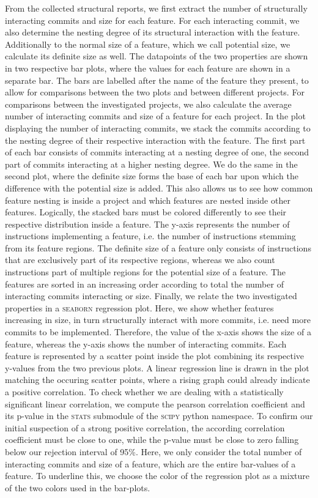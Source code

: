 From the collected structural reports, we first extract the number of structurally interacting commits and size for each feature.
For each interacting commit, we also determine the nesting degree of its structural interaction with the feature.
Additionally to the normal size of a feature, which we call \textsf{potential} size, we calculate its \textsf{definite} size as well. 
The datapoints of the two properties are shown in two respective bar plots, where the values for each feature are shown in a separate bar.
The bars are labelled after the name of the feature they present, to allow for comparisons between the two plots and between different projects.
For comparisons between the investigated projects, we also calculate the average number of interacting commits and size of a feature for each project.
In the plot displaying the number of interacting commits, we stack the commits according to the nesting degree of their respective interaction with the feature.
The first part of each bar consists of commits interacting at a nesting degree of one, the second part of commits interacting at a higher nesting degree.
We do the same in the second plot, where the definite size forms the base of each bar upon which the difference with the potential size is added.
This also allows us to see how common feature nesting is inside a project and which features are nested inside other features.
Logically, the stacked bars must be colored differently to see their respective distribution inside a feature.
The y-axis represents the number of instructions implementing a feature, i.e. the number of instructions stemming from its feature regions.
The definite size of a feature only consists of instructions that are exclusively part of its respective regions, whereas we also count instructions part of multiple regions for the potential size of a feature.
The features are sorted in an increasing order according to total the number of interacting commits interacting or size.
Finally, we relate the two investigated properties in a \textsc{seaborn} regression plot.
Here, we show whether features increasing in size, in turn structurally interact with more commits, i.e. need more commits to be implemented.
Therefore, the value of the x-axis shows the size of a feature, whereas the y-axis shows the number of interacting commits.
Each feature is represented by a scatter point inside the plot combining its respective y-values from the two previous plots.
A linear regression line is drawn in the plot matching the occuring scatter points, where a rising graph could already indicate a positive correlation.
To check whether we are dealing with a statistically significant linear correlation, we compute the pearson correlation coefficient and its p-value in the \textsc{stats} submodule of the \textsc{scipy} python namespace.
To confirm our initial suspection of a strong positive correlation, the according correlation coefficient must be close to one, while the p-value must be close to zero falling below our rejection interval of 95\%.
Here, we only consider the total number of interacting commits and size of a feature, which are the entire bar-values of a feature.
To underline this, we choose the color of the regression plot as a mixture of the two colors used in the bar-plots.

